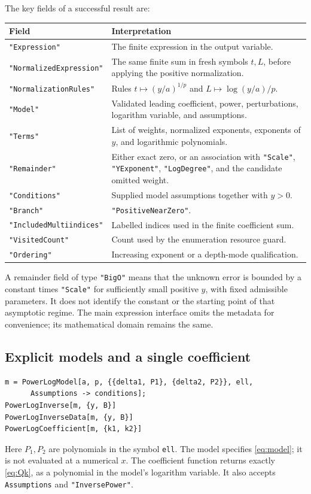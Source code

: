 \documentclass[11pt,a4paper]{article}
\theoremstyle{definition}
\theoremstyle{remark}
\newcommand{\code}[1]{\texttt{#1}}
\begin{document}
The key fields of a successful result are:
\begin{longtable}{@{}p{46mm}p{101mm}@{}}
\toprule Field & Interpretation\\\midrule\endhead
\code{"Expression"} & The finite expression in the output variable.\\
\code{"NormalizedExpression"} & The same finite sum in fresh symbols $t,L$, before applying the positive normalization.\\
\code{"NormalizationRules"} & Rules $t\mapsto(y/a)^{1/p}$ and $L\mapsto\log(y/a)/p$.\\
\code{"Model"} & Validated leading coefficient, power, perturbations, logarithm variable, and assumptions.\\
\code{"Terms"} & List of weights, normalized exponents, exponents of $y$, and logarithmic polynomials.\\
\code{"Remainder"} & Either exact zero, or an association with \code{"Scale"}, \code{"YExponent"}, \code{"LogDegree"}, and the candidate omitted weight.\\
\code{"Conditions"} & Supplied model assumptions together with $y>0$.\\
\code{"Branch"} & \code{"PositiveNearZero"}.\\
\code{"IncludedMultiindices"} & Labelled indices used in the finite coefficient sum.\\
\code{"VisitedCount"} & Count used by the enumeration resource guard.\\
\code{"Ordering"} & Increasing exponent or a depth-mode qualification.\\
\bottomrule
\end{longtable}

A remainder field of type \code{"BigO"} means that the unknown error is bounded
by a constant times \code{"Scale"} for sufficiently small positive $y$, with
fixed admissible parameters. It does not identify the constant or the starting
point of that asymptotic regime. The main expression interface omits the
metadata for convenience; its mathematical domain remains the same.

\subsection{Explicit models and a single coefficient}

\begin{lstlisting}
m = PowerLogModel[a, p, {{delta1, P1}, {delta2, P2}}, ell,
      Assumptions -> conditions];
PowerLogInverse[m, {y, B}]
PowerLogInverseData[m, {y, B}]
PowerLogCoefficient[m, {k1, k2}]
\end{lstlisting}
Here $P_1,P_2$ are polynomials in the symbol \code{ell}. The model specifies
\eqref{eq:model}; it is not evaluated at a numerical $x$. The coefficient
function returns exactly \eqref{eq:Qk}, as a polynomial in the model's
logarithm variable. It also accepts \code{Assumptions} and
\code{"InversePower"}.
\end{document}
